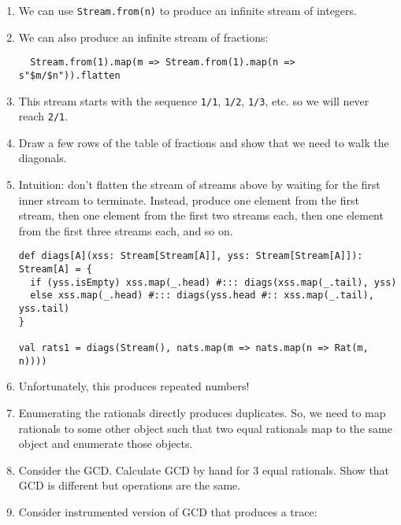 \documentclass[9pt]{extbook}
\begin{document}
\begin{enumerate}

\item We can use \lstinline|Stream.from(n)| to produce an infinite stream of integers.

\item We can also produce an infinite stream of fractions:

  \begin{lstlisting}
  Stream.from(1).map(m => Stream.from(1).map(n => s"$m/$n")).flatten
  \end{lstlisting}

\item This stream starts with the sequence \lstinline|1/1|, \lstinline|1/2|, \lstinline|1/3|, etc.
  so we will never reach \lstinline|2/1|.

\item Draw a few rows of the table of fractions and show that we need to walk the diagonals.

\item Intuition: don't flatten the stream of streams above by waiting for the first inner stream
  to terminate. Instead, produce one element from the first stream, then one element from the
  first two streams each, then one element from the first three streams each, and so on.

  \begin{lstlisting}
def diags[A](xss: Stream[Stream[A]], yss: Stream[Stream[A]]): Stream[A] = {
  if (yss.isEmpty) xss.map(_.head) #::: diags(xss.map(_.tail), yss)
  else xss.map(_.head) #::: diags(yss.head #:: xss.map(_.tail), yss.tail)
}

val rats1 = diags(Stream(), nats.map(m => nats.map(n => Rat(m, n))))
  \end{lstlisting}

\item Unfortunately, this produces repeated numbers!

\item Enumerating the rationals directly produces duplicates. So, we
  need to map rationals to some other object such that two equal rationals map to the
  same object and enumerate those objects.

\item Consider the GCD. Calculate GCD by hand for 3 equal rationals. Show that GCD is different
  but operations are the same.

\item Consider instrumented version of GCD that produces a trace:


\end{enumerate}
\end{document}
